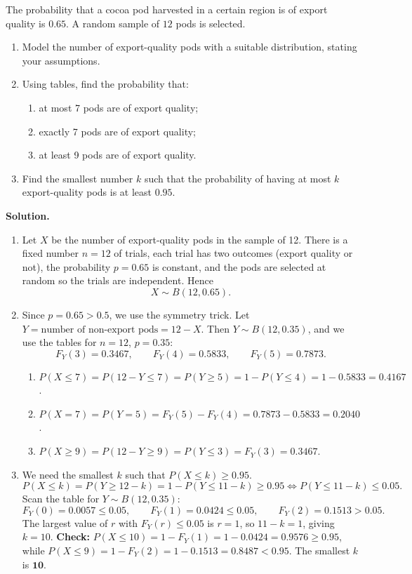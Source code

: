 \documentclass[11pt]{article}
\begin{document}
\begin{exoresolu}
The probability that a cocoa pod harvested in a certain region is of export quality is $0.65$. A random sample of $12$ pods is selected.
\begin{enumerate}
    \item Model the number of export-quality pods with a suitable distribution, stating your assumptions.
    \item Using tables, find the probability that:
    \begin{enumerate}
        \item at most 7 pods are of export quality;
        \item exactly 7 pods are of export quality;
        \item at least 9 pods are of export quality.
    \end{enumerate}
    \item Find the smallest number $k$ such that the probability of having at most $k$ export-quality pods is at least $0.95$.
\end{enumerate}
\tcblower
\textbf{Solution.}
\begin{enumerate}
    \item Let $X$ be the number of export-quality pods in the sample of 12. There is a fixed number $n=12$ of trials, each trial has two outcomes (export quality or not), the probability $p = 0.65$ is constant, and the pods are selected at random so the trials are independent. Hence
    \[
    X \sim B(12, 0.65).
    \]
    \item Since $p = 0.65 > 0.5$, we use the symmetry trick. Let $Y = \text{number of non-export pods} = 12 - X$. Then $Y \sim B(12, 0.35)$, and we use the tables for $n=12$, $p=0.35$:
    \[
    F_Y(3) = 0.3467, \qquad F_Y(4) = 0.5833, \qquad F_Y(5) = 0.7873.
    \]
    \begin{enumerate}
        \item $P(X \le 7) = P(12 - Y \le 7) = P(Y \ge 5) = 1 - P(Y \le 4) = 1 - 0.5833 = \mathbf{0.4167}$.
        \item $P(X = 7) = P(Y = 5) = F_Y(5) - F_Y(4) = 0.7873 - 0.5833 = \mathbf{0.2040}$.
        \item $P(X \ge 9) = P(12 - Y \ge 9) = P(Y \le 3) = F_Y(3) = \mathbf{0.3467}$.
    \end{enumerate}
    \item We need the smallest $k$ such that $P(X \le k) \ge 0.95$.
    \[
    P(X \le k) = P(Y \ge 12 - k) = 1 - P(Y \le 11 - k) \ge 0.95
    \iff P(Y \le 11 - k) \le 0.05.
    \]
    Scan the table for $Y \sim B(12, 0.35)$:
    \[
    F_Y(0) = 0.0057 \le 0.05, \qquad F_Y(1) = 0.0424 \le 0.05, \qquad F_Y(2) = 0.1513 > 0.05.
    \]
    The largest value of $r$ with $F_Y(r) \le 0.05$ is $r = 1$, so $11 - k = 1$, giving $k = 10$.
    \textbf{Check:} $P(X \le 10) = 1 - F_Y(1) = 1 - 0.0424 = 0.9576 \ge 0.95$, while $P(X \le 9) = 1 - F_Y(2) = 1 - 0.1513 = 0.8487 < 0.95$.
    The smallest $k$ is $\mathbf{10}$.
\end{enumerate}
\end{exoresolu}
\end{document}
